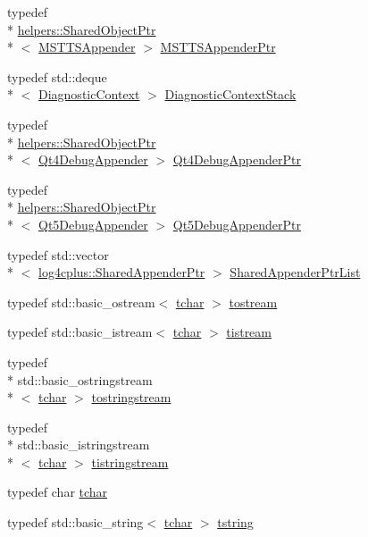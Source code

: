 \begin{DoxyCompactItemize}
typedef \\*
\hyperlink{classlog4cplus_1_1helpers_1_1SharedObjectPtr}{helpers\-::\-Shared\-Object\-Ptr}\\*
$<$ \hyperlink{classlog4cplus_1_1MSTTSAppender}{M\-S\-T\-T\-S\-Appender} $>$ \hyperlink{namespacelog4cplus_a87109c16bf25081e70e4ad3d4c799964}{M\-S\-T\-T\-S\-Appender\-Ptr}
\item 
typedef std\-::deque\\*
$<$ \hyperlink{structlog4cplus_1_1DiagnosticContext}{Diagnostic\-Context} $>$ \hyperlink{namespacelog4cplus_ac62a7721683971c9b4f2b697aa7f03fb}{Diagnostic\-Context\-Stack}
\item 
typedef \\*
\hyperlink{classlog4cplus_1_1helpers_1_1SharedObjectPtr}{helpers\-::\-Shared\-Object\-Ptr}\\*
$<$ \hyperlink{classlog4cplus_1_1Qt4DebugAppender}{Qt4\-Debug\-Appender} $>$ \hyperlink{namespacelog4cplus_af461423bca3efc0b77db918c413acace}{Qt4\-Debug\-Appender\-Ptr}
\item 
typedef \\*
\hyperlink{classlog4cplus_1_1helpers_1_1SharedObjectPtr}{helpers\-::\-Shared\-Object\-Ptr}\\*
$<$ \hyperlink{classlog4cplus_1_1Qt5DebugAppender}{Qt5\-Debug\-Appender} $>$ \hyperlink{namespacelog4cplus_afceeef4e59b8ef61f097251fe6cd3f52}{Qt5\-Debug\-Appender\-Ptr}
\item 
typedef std\-::vector\\*
$<$ \hyperlink{namespacelog4cplus_a12d841b842c72396be9219ce67a0c215}{log4cplus\-::\-Shared\-Appender\-Ptr} $>$ \hyperlink{namespacelog4cplus_a97158ac12736f649c5477d7b63f51ede}{Shared\-Appender\-Ptr\-List}
\item 
typedef std\-::basic\-\_\-ostream$<$ \hyperlink{namespacelog4cplus_a7b80b5711ae9e7a1ddd97dbaefbe3583}{tchar} $>$ \hyperlink{namespacelog4cplus_aef9e0c9a1adafed82c39fdef478716e1}{tostream}
\item 
typedef std\-::basic\-\_\-istream$<$ \hyperlink{namespacelog4cplus_a7b80b5711ae9e7a1ddd97dbaefbe3583}{tchar} $>$ \hyperlink{namespacelog4cplus_aa09fa8d7ec3f48e80ed15d5a1dbc38a7}{tistream}
\item 
typedef \\*
std\-::basic\-\_\-ostringstream\\*
$<$ \hyperlink{namespacelog4cplus_a7b80b5711ae9e7a1ddd97dbaefbe3583}{tchar} $>$ \hyperlink{namespacelog4cplus_a6c2af4aefe22c776bb931aa272df1123}{tostringstream}
\item 
typedef \\*
std\-::basic\-\_\-istringstream\\*
$<$ \hyperlink{namespacelog4cplus_a7b80b5711ae9e7a1ddd97dbaefbe3583}{tchar} $>$ \hyperlink{namespacelog4cplus_a97831e9182bf2d2fe27e1296d9881428}{tistringstream}
\item 
typedef char \hyperlink{namespacelog4cplus_a7b80b5711ae9e7a1ddd97dbaefbe3583}{tchar}
\item 
typedef std\-::basic\-\_\-string$<$ \hyperlink{namespacelog4cplus_a7b80b5711ae9e7a1ddd97dbaefbe3583}{tchar} $>$ \hyperlink{namespacelog4cplus_a3c9287f6ebcddc50355e29d71152117b}{tstring}
\end{DoxyCompactItemize}
